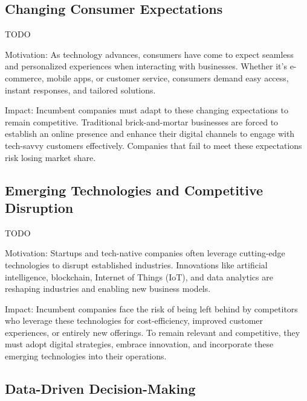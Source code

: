 \documentclass[a4]{scrartcl}
\begin{document}
\subsection{Changing Consumer Expectations} \label{subsec:ChangingConsumerExpectations}

		TODO

		Motivation: As technology advances, consumers have come to expect seamless and personalized experiences when interacting with businesses. Whether it's e-commerce, mobile apps, or customer service, consumers demand easy access, instant responses, and tailored solutions.
		
		
		
		Impact: Incumbent companies must adapt to these changing expectations to remain competitive. Traditional brick-and-mortar businesses are forced to establish an online presence and enhance their digital channels to engage with tech-savvy customers effectively. Companies that fail to meet these expectations risk losing market share.

	
	
	
\subsection{Emerging Technologies and Competitive Disruption} \label{subsec:EmergingTechnologiesandCompetitiveDisruption}

	TODO

	Motivation: Startups and tech-native companies often leverage cutting-edge technologies to disrupt established industries. Innovations like artificial intelligence, blockchain, Internet of Things (IoT), and data analytics are reshaping industries and enabling new business models.
	
	
	
	Impact: Incumbent companies face the risk of being left behind by competitors who leverage these technologies for cost-efficiency, improved customer experiences, or entirely new offerings. To remain relevant and competitive, they must adopt digital strategies, embrace innovation, and incorporate these emerging technologies into their operations.
	
	
\subsection{Data-Driven Decision-Making} \label{subsec:DataDrivenDecisionMaking}
\end{document}
